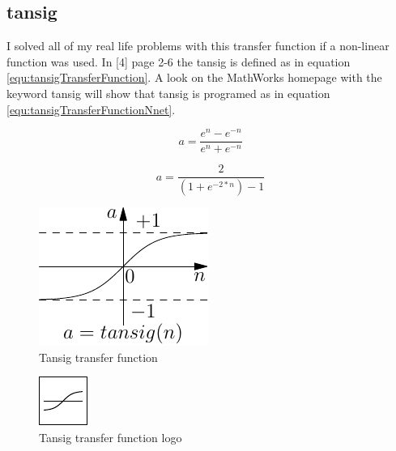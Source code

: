 \subsection{tansig}

\noindent
I solved all of my real life problems with this transfer function if a non-linear function was used. In [4] page 2-6 the tansig is defined as in equation \eqref{equ:tansigTransferFunction}. A look on the MathWorks homepage with the keyword tansig will show that tansig is programed as in equation \eqref{equ:tansigTransferFunctionNnet}.

\begin{equation}
	a = \frac{e^n - e^{-n}}{e^n + e^{-n}}
	\label{equ:tansigTransferFunction}
\end{equation}

\begin{equation}
	a = \frac{2}{(1 + e^{-2*n})-1}
	\label{equ:tansigTransferFunctionNnet}
\end{equation}


\begin{figure}[htb]
\centering
  \includegraphics{octave/neuroPackage/graphics/tansig}
\caption{Tansig transfer function}
\label{fig:tansigTransferFunction}
\end{figure}

\begin{figure}[htb]
\centering
  \includegraphics{octave/neuroPackage/graphics/tansiglogo}
\caption{Tansig transfer function logo}
\label{fig:tansigTransferFunctionLogo}
\end{figure}
